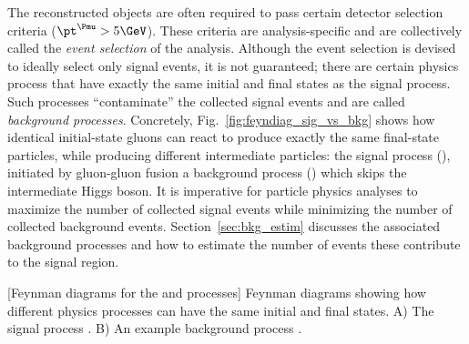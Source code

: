 The reconstructed objects are often required to pass certain detector selection criteria (\eg $\pt^\Pmu > 5\GeV$).
These criteria are analysis-specific and are collectively called the \emph{event selection} of the analysis.
Although the event selection is devised to ideally select only signal events, it is not guaranteed;
there are certain physics process that have exactly the same initial and final states as the signal process.
Such processes ``contaminate'' the collected signal events and are called \emph{background processes}.
Concretely, Fig.~\ref{fig:feyndiag_sig_vs_bkg} shows how identical initial-state gluons can react to produce exactly the same final-state particles, while producing different intermediate particles:
the signal process (\gghzzfourl), initiated by gluon-gluon fusion \vs a background process (\ggzzfourl) which skips the intermediate Higgs boson.
It is imperative for particle physics analyses to maximize the number of collected signal events while minimizing the number of collected background events.
Section~\ref{sec:bkg_estim} discusses the associated background processes and how to estimate the number of events these contribute to the signal region.
\begin{multiFigure}
	\centering
		[Feynman diagrams for the \gghzzfourl and \ggzzstarfourl processes]
		{Feynman diagrams showing how different physics processes can have the same initial and final states.
		\;A) The signal process \gghzzfourl. %
		\;B) An example background process \ggzzstarfourl.
		}
	\label{fig:feyndiag_sig_vs_bkg}
\end{multiFigure}



